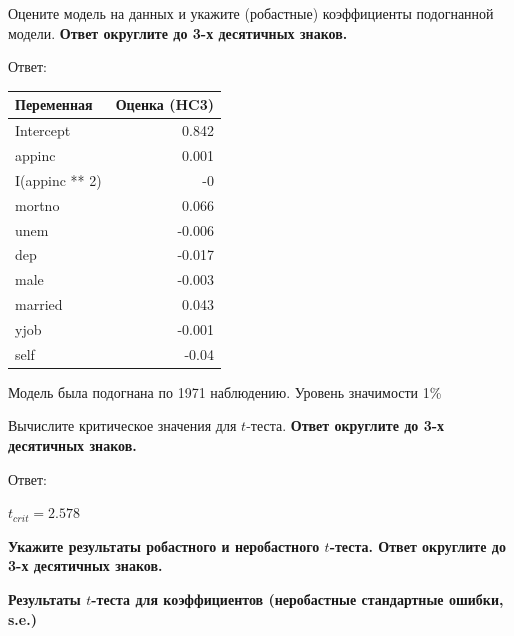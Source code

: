 \documentclass[
  russian,
]{article}
\newcounter{none} %
\begin{document}
Оцените модель на данных и укажите (робастные) коэффициенты подогнанной
модели. \textbf{Ответ округлите до 3-х десятичных знаков.}

Ответ:

{\def\LTcaptype{none} %
\begin{longtable}[]{@{}lr@{}}
\toprule\noalign{}
Переменная & Оценка (HC3) \\
\midrule\noalign{}
\endhead
\bottomrule\noalign{}
\endlastfoot
Intercept & 0.842 \\
appinc & 0.001 \\
I(appinc ** 2) & -0 \\
mortno & 0.066 \\
unem & -0.006 \\
dep & -0.017 \\
male & -0.003 \\
married & 0.043 \\
yjob & -0.001 \\
self & -0.04 \\
\end{longtable}
}

Модель была подогнана по 1971 наблюдению. {Уровень значимости 1\%}

Вычислите критическое значения для \(t\)-теста. \textbf{Ответ округлите
до 3-х десятичных знаков.}

Ответ:

\begin{tcolorbox}[enhanced jigsaw, arc=.35mm, bottomrule=.15mm, bottomtitle=1mm, breakable, colback=white, colbacktitle=quarto-callout-note-color!10!white, colframe=quarto-callout-note-color-frame, coltitle=black, left=2mm, leftrule=.75mm, opacityback=0, opacitybacktitle=0.6, rightrule=.15mm, title=\textcolor{quarto-callout-note-color}{\faInfo}\hspace{0.5em}{Критическое значение}, titlerule=0mm, toprule=.15mm, toptitle=1mm]

\(t_{crit} = 2.578\)

\end{tcolorbox}

\textbf{Укажите результаты робастного и неробастного \(t\)-теста. Ответ
округлите до 3-х десятичных знаков.}

\textbf{Результаты \(t\)-теста для коэффициентов (неробастные
стандартные ошибки, s.e.)}
\end{document}
